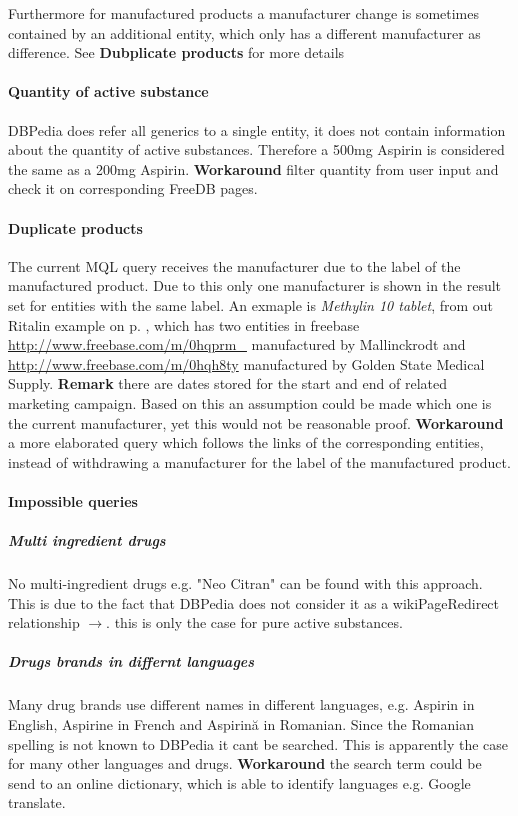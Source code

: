 \documentclass[11pt,titlepage,oneside,openany]{book}
\begin{document}
Furthermore for manufactured products a manufacturer change is sometimes contained by an additional entity, which only has a different manufacturer as difference. See \textbf{Dubplicate products} for more details

\paragraph{Quantity of active substance}
DBPedia does refer all generics to a single entity, it does not contain information about the quantity of active substances. Therefore a 500mg Aspirin is considered the same as a 200mg Aspirin.
\textbf{Workaround} filter quantity from user input and check it on corresponding FreeDB pages.


\paragraph{Duplicate products}
\label{limitations:dubplicates} 
The current MQL query receives the manufacturer due to the label of the manufactured product. Due to this only one manufacturer is shown in the result set for entities with the same label. An exmaple is \textit{Methylin 10 tablet}, from out Ritalin example on  p. \pageref{example:ritalin}, which has two entities in freebase \url{http://www.freebase.com/m/0hqprm_} manufactured by Mallinckrodt and \url{http://www.freebase.com/m/0hqh8ty} manufactured by Golden State Medical Supply. \textbf{Remark} there are dates stored for the start and end of related marketing campaign. Based on this an assumption could be made which one is the current manufacturer, yet this would not be reasonable proof. \textbf{Workaround} a more elaborated query which follows the links of the corresponding entities, instead of withdrawing a manufacturer for the label of the manufactured product.


\paragraph{Impossible queries}
\label{drug_cocktail}
\subparagraph{Multi ingredient drugs} No multi-ingredient drugs e.g. "Neo Citran" can be found with this approach. This is due to the fact that DBPedia does not consider it as a wikiPageRedirect relationship $\rightarrow$. this is only the case for pure active substances.

\subparagraph{Drugs brands in differnt languages}
\label{drug_foregin_name}
Many drug brands use different names in different languages, e.g. Aspirin in English, Aspirine in French and Aspirin\u{a} in Romanian. Since the Romanian spelling is not known to DBPedia it cant be searched. This is apparently the case for many other languages and drugs. \textbf{Workaround} the search term could be send to an online dictionary, which is able to identify languages e.g. Google translate.
\end{document}
